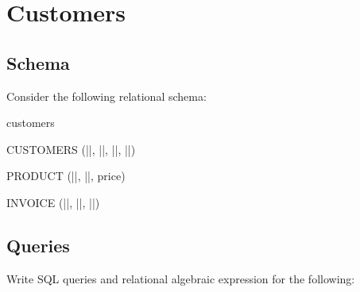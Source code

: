 \section{Customers}

\subsection{Schema}

Consider the following relational schema:

\begin{sqlSchema}{customers}

    CUSTOMERS (||, ||, ||, ||)

    PRODUCT (||, ||, price)

    INVOICE (||, ||, ||)

\end{sqlSchema}

\subsection{Queries}

Write SQL queries and relational algebraic expression for the following:

